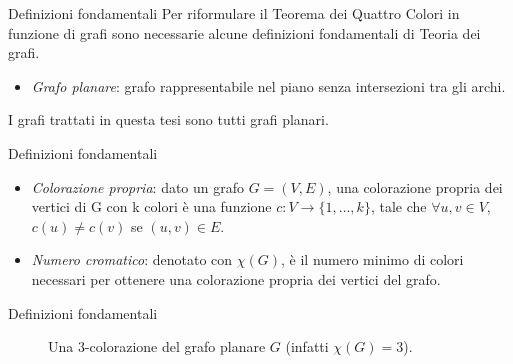 \documentclass{beamer}
\begin{document}
	\begin{frame}{Definizioni fondamentali}
		Per riformulare il Teorema dei Quattro Colori in funzione di grafi sono necessarie alcune definizioni fondamentali di Teoria dei grafi.
		\begin{itemize}
			\item \emph{Grafo planare}: grafo rappresentabile nel piano senza intersezioni tra gli archi.
		\end{itemize}
		I grafi trattati in questa tesi sono tutti grafi planari.
	\end{frame}
	
	\begin{frame}{Definizioni fondamentali}
		\begin{itemize}
			\item \emph{Colorazione propria}: dato un grafo $G=(V,E)$, una colorazione propria dei vertici di G con k colori è una funzione $c \colon V \to \{1,\dots,k\}$, tale che $\forall u, v \in V$, $c(u) \ne c(v)$ se $(u,v) \in E$.
			\item \emph{Numero cromatico}: denotato con $\chi(G)$, è il numero minimo di colori necessari per ottenere una colorazione propria dei vertici del grafo.
		\end{itemize}
	\end{frame}
	
	\begin{frame}{Definizioni fondamentali}
		\begin{figure}
			\centering
			\vspace{0.5cm}
			\caption{Una 3-colorazione del grafo planare $G$ (infatti $\chi(G) = 3$).}
		\end{figure}
	\end{frame}
	
\end{document}
